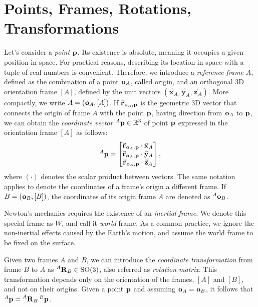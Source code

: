 \section{Points, Frames, Rotations, Transformations}

Let's consider a \emph{point} $\pos$.
Its existence is absolute, meaning it occupies a given position in space.
For practical reasons, describing its location in space with a tuple of real numbers is convenient.
Therefore, we introduce a \emph{reference frame} $A$, defined as the combination of a point $\ori_A$, called origin, and an orthogonal 3D orientation frame $[A]$, defined by the unit vectors $(\vec{\mathbf{x}}_A, \vec{\mathbf{y}}_A, \vec{\mathbf{z}}_A)$.
More compactly, we write $A = (\ori_A, [A])$.
If $\vec{\mathbf{r}}_{\ori_A, \pos}$ is the geometric 3D vector that connects the origin of frame $A$ with the point $\pos$, having direction from $\ori_A$ to $\pos$, we can obtain the \emph{coordinate vector} $\pos[A] \in \realn^3$ of point $\pos$ expressed in the orientation frame $[A]$ as follows:
%
\begin{equation*}
    \pos[A] =
    \begin{bmatrix}
        \vec{\mathbf{r}}_{\ori_A, \pos} \cdot \vec{\mathbf{x}}_A \\
        \vec{\mathbf{r}}_{\ori_A, \pos} \cdot \vec{\mathbf{y}}_A \\
        \vec{\mathbf{r}}_{\ori_A, \pos} \cdot \vec{\mathbf{z}}_A
    \end{bmatrix}
    ,
\end{equation*}
%
where $(\cdot)$ denotes the scalar product between vectors.
The same notation applies to denote the coordinates of a frame's origin \wrt a different frame.
If $B = (\ori_B, [B])$, the coordinates of its origin \wrtl frame $A$ are denoted as $\ori[A]_B$.

\begin{definition*}
%
Newton's mechanics requires the existence of an \emph{inertial frame}.
We denote this special frame as $W$, and call it \emph{world} frame.
As a common practice, we ignore the non-inertial effects caused by the Earth's motion, and assume the world frame to be fixed on the surface.
%
\end{definition*}

Given two frames $A$ and $B$, we can introduce the \emph{coordinate transformation} from frame $B$ to $A$ as $\rot[A]_B \in \SO(3)$, also referred as \emph{rotation matrix}.
This transformation depends only on the orientation of the frames, $[A]$ and $[B]$, and not on their origins.
Given a point $\pos$ and assuming $\ori_A = \ori_B$, it follows that $\pos[A] = \rot[A]_B \pos[B]$.

